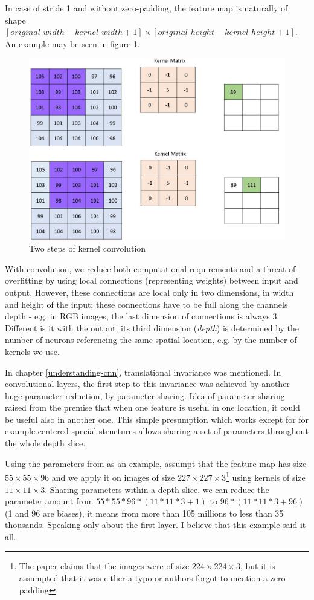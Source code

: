 In case of stride 1 and without zero-padding, the feature map is naturally of 
shape $[original\_width - kernel\_width + 1] \times [original\_height - 
kernel\_height + 1]$. An example may be seen in figure \ref{fig:conv}. 

\begin{figure}[H]
   \centering
	\includegraphics[width=.4\linewidth]{./pictures/conv.jpg}
	\caption[Kernel convolution]{Two steps of kernel convolution}
      \label{fig:conv}
\end{figure}

With convolution, we reduce both computational requirements and a threat of 
overfitting by using local connections (representing weights) between input and 
output. However, these connections are local only in two dimensions, in width 
and height of the input; these connections have to be full along the channels 
depth - e.g. in RGB images, the last dimension of connections is always 3. 
Different is it with the output; its third dimension (\textit{depth}) is 
determined by the number of neurons referencing the same spatial location, e.g. 
by the number of kernels we use. 

In chapter \ref{understanding-cnn}, translational invariance was mentioned. In 
convolutional layers, the first step to this invariance was achieved by another 
huge parameter reduction, by parameter sharing. Idea of parameter sharing raised 
from the premise that when one feature is useful in one location, it could be 
useful also in another one. This simple presumption which works except for for 
example centered special structures allows sharing a set of parameters 
throughout the whole depth slice. 

Using the parameters from \cite{cnn-classification} as an example, assumpt that 
the feature map has size $55 \times 55 \times 96$ and we apply it on images of 
size $227 \times 227 \times 3$\footnote{The paper claims that the images were of 
size $224 \times 224 \times 3$, but it is assumpted that it was either a typo or 
authors forgot to mention a zero-padding} using kernels of size $11 \times 11 
\times 3$. Sharing parameters within a depth slice, we can reduce the parameter 
amount from $55 * 55 * 96 * (11 * 11 * 3 + 1)$ to $96 * (11 * 11 * 3 + 96)$ (1 
and 96 are biases), it means from more than 105 millions to less than 35 
thousands. Speaking only about the first layer. I believe that this example said 
it all. 

